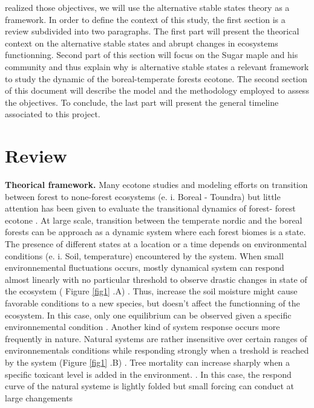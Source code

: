 realized those objectives, we will use the alternative stable states theory as
a framework. In order to define the context of this study, the first section
is a review subdivided into two paragraphs. The first part will present the
theorical context on the alternative stable states and abrupt changes in
ecosystems functionning. Second part of this section will focus on the Sugar
maple and his community and thus explain why is alternative stable states a
relevant framework to study the dynamic of the boreal-temperate forests
ecotone.  The second section of this document will describe the model and the
methodology employed to assess the objectives. To conclude, the last part will
present the general timeline associated to this project. 

\section{Review} \textbf{Theorical framework.}  Many ecotone studies and
modeling efforts on transition between forest to none-forest ecosystems (e. i.
Boreal - Toundra) \cite{Scheffer2012,Scheffer2001,Hirota2011} but little
attention has been given to evaluate the transitional dynamics of forest-
forest ecotone \cite{Goldblum2010,Graignic2013}. At large scale, transition
between  the temperate nordic and the boreal forests can be approach as a
dynamic system where each forest biomes is a state. The presence of different
states at a location or a time depends on environmental conditions (e. i.
Soil, temperature) encountered by the system. When small environnemental
fluctuations occurs, mostly dynamical system can respond almost linearly with
no particular threshold to observe drastic changes in state of the ecosystem (
Figure \ref{fig1} .A) \cite{Scheffer2001,Scheffer2009}. Thus, increase the
soil moisture might cause favorable conditions to a new species, but doesn't
affect the functionning of the ecosystem. In this case, only one equilibrium
can be observed given a specific environnemental condition
\cite{Scheffer2001,Scheffer2009,scheffer2009critical}. Another kind of system
response occurs more frequently in nature.  Natural systems are rather
insensitive over certain ranges of environnementals conditions while
responding strongly when a treshold is reached by the system (Figure
\ref{fig1} .B) \cite{scheffer2009critical}. Tree mortality can increase
sharply when a specific toxicant level is added in the environment.
\cite{scheffer2009critical}. In this case, the respond curve of the natural
systeme is lightly folded but small forcing can conduct at large changements

